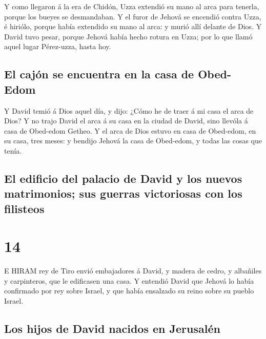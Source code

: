  Y como llegaron á la era de Chidón, Uzza extendió su mano
al arca para tenerla, porque los bueyes se desmandaban.  Y
el furor de Jehová se encendió contra Uzza, é hiriólo, porque había
extendido su mano al arca: y murió allí delante de Dios.  Y
David tuvo pesar, porque Jehová había hecho rotura en Uzza; por lo que
llamó aquel lugar Pérez-uzza, hasta hoy.

\hypertarget{el-cajuxf3n-se-encuentra-en-la-casa-de-obed-edom}{%
\subsection{El cajón se encuentra en la casa de
Obed-Edom}\label{el-cajuxf3n-se-encuentra-en-la-casa-de-obed-edom}}

 Y David temió á Dios aquel día, y dijo: ¿Cómo he de traer
á mi casa el arca de Dios?  Y no trajo David el arca á su
casa en la ciudad de David, sino llevóla á casa de Obed-edom Getheo.
 Y el arca de Dios estuvo en casa de Obed-edom, en su casa,
tres meses: y bendijo Jehová la casa de Obed-edom, y todas las cosas que
tenía.

\hypertarget{el-edificio-del-palacio-de-david-y-los-nuevos-matrimonios-sus-guerras-victoriosas-con-los-filisteos}{%
\subsection{El edificio del palacio de David y los nuevos matrimonios;
sus guerras victoriosas con los
filisteos}\label{el-edificio-del-palacio-de-david-y-los-nuevos-matrimonios-sus-guerras-victoriosas-con-los-filisteos}}

\hypertarget{section-13}{%
\section{14}\label{section-13}}

 E HIRAM rey de Tiro envió embajadores á David, y madera de
cedro, y albañiles y carpinteros, que le edificasen una casa.
 Y entendió David que Jehová lo había confirmado por rey
sobre Israel, y que había ensalzado su reino sobre su pueblo Israel.

\hypertarget{los-hijos-de-david-nacidos-en-jerusaluxe9n}{%
\subsection{Los hijos de David nacidos en
Jerusalén}\label{los-hijos-de-david-nacidos-en-jerusaluxe9n}}

